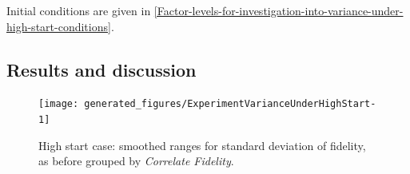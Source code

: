 Initial conditions are given in \cref{Factor-levels-for-investigation-into-variance-under-high-start-conditions}.

\subsection{Results and discussion}

\begin{knitrout}
\color{fgcolor}\begin{figure}[htp]
\texttt{[image: generated\_figures/ExperimentVarianceUnderHighStart-1]} \caption[High start case]{High start case: smoothed ranges for standard deviation of fidelity, as before grouped by \emph{Correlate Fidelity}.}\label{fig:ExperimentVarianceUnderHighStart}
\end{figure}


\end{knitrout}

